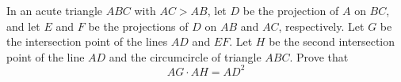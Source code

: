 In an acute triangle $ABC$ with $AC > AB$,  let $D$ be the projection of $A$ on $BC$,  and let $E$ and $F$ be the projections of $D$ on $AB$ and $AC$,  respectively. Let $G$ be the intersection point of the lines $AD$ and $EF$. Let $H$ be the second intersection point of the line $AD$ and the circumcircle of triangle $ABC$. Prove that \[AG \cdot AH=AD^2\]
